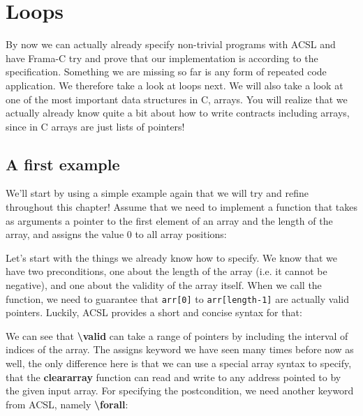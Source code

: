 \chapter{Loops}

By now we can actually already specify non-trivial programs with ACSL and have Frama-C try and prove that our implementation is according to the specification. Something we are missing so far is any form of repeated code application. We therefore take a look at loops next. We will also take a look at one of the most important data structures in C, arrays. You will realize that we actually already know quite a bit about how to write contracts including arrays, since in C arrays are just lists of pointers! 

\section{A first example}

We'll start by using a simple example again that we will try and refine throughout this chapter! Assume that we need to implement a function that takes as arguments a pointer to the first element of an array and the length of the array, and assigns the value 0 to all array positions: 


Let's start with the things we already know how to specify. We know that we have two preconditions, one about the length of the array (i.e. it cannot be negative), and one about the validity of the array itself. When we call the function, we need to guarantee that \texttt{arr[0]} to \texttt{arr[length-1]} are actually valid pointers. Luckily, ACSL provides a short and concise syntax for that:


We can see that \textbf{\textbackslash valid} can take a range of pointers by including the interval of indices of the array. The assigns keyword we have seen many times before now as well, the only difference here is that we can use a special array syntax to specify, that the \textbf{clear\textunderscore array} function can read and write to any address pointed to by the given input array. For specifying the postcondition, we need another keyword from ACSL, namely \textbf{\textbackslash forall}:


